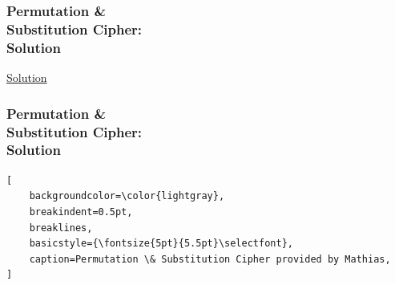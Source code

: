 \documentclass{uva-inf-presentation}
\begin{document}
\begin{frame}
\frametitle{Permutation \&\\ Substitution Cipher:\\ Solution}
\href{http://tholman.com/other/transposition/}{Solution}
\end{frame}

\begin{frame}[containsverbatim]
\frametitle{Permutation \&\\ Substitution Cipher:\\ Solution}
\vspace{-20pt}
\begin{lstlisting}[
    backgroundcolor=\color{lightgray},
    breakindent=0.5pt,
    breaklines,
    basicstyle={\fontsize{5pt}{5.5pt}\selectfont},
    caption=Permutation \& Substitution Cipher provided by Mathias,
]

\end{lstlisting}
\end{frame}
\end{document}
